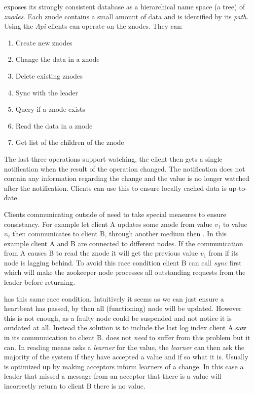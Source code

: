 \zookeeper{} exposes its strongly consistent database as a hierarchical name space (a tree) of \textit{znodes}. Each {znode} contains a small amount of data and is identified by its \textit{path}. Using the \textit{Api} clients can operate on the znodes. They can: 
%
\begin{multicols}{2}
\begin{enumerate}
	\item Create new znodes
	\item Change the data in a znode
	\item Delete existing znodes
	\item Sync with the leader
	\item Query if a znode exists
	\item Read the data in a znode
	\item Get list of the children of the znode
\end{enumerate}
\end{multicols}
%
The last three operations support watching, the client then gets a single notification when the result of the operation changed. The notification does not contain any information regarding the change and the value is no longer watched after the notification. Clients can use this to ensure locally cached data is up-to-date. 

Clients communicating outside of \zookeeper{} need to take special measures to ensure consistancy. For example let client A updates some znode from value $v_1$ to value $v_2$ then communicates to client B, through another medium then \zookeeper{}. In this example client A and B are connected to different \zookeeper{} nodes. If the communication from A causes B to read the znode it will get the previous value $v_1$ from \zookeeper{} if its \zookeeper{} node is lagging behind. To avoid this race condition client B can call \textit{sync} first which will make the zookeeper node processes all outstanding requests from the leader before returning.

\raft{} has this same race condition. Intuitively it seems as we can just ensure a heartbeat has passed, by then all (functioning) node will be updated. However this is not enough, as a faulty node could be suspended and not notice it is outdated at all. Instead the solution is to include the last log index client A saw in its communication to client B. \paxos{} does not \textit{need} to suffer from this problem but it can. In \paxos{} reading means asks a \textit{learner} for the value, the \textit{learner} can then ask the majority of the system if they have accepted a value and if so what it is. Usually \paxos{} is optimized up by making acceptors inform learners of a change. In this case a leader that missed a message from an acceptor that there is a value will incorrectly return to client B there is no value.
